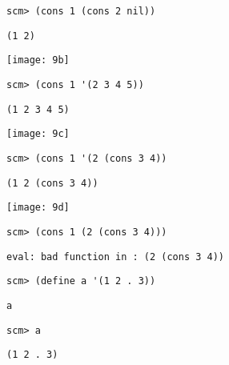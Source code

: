 \documentclass{exam}
\begin{document}
\begin{questions}
\begin{blocksection}
\begin{lstlisting}
scm> (cons 1 (cons 2 nil))
\end{lstlisting}
\begin{solution}[0.25in]
\texttt{(1 2)}
\begin{center}
\texttt{[image: 9b]}
\end{center}
\end{solution}

\begin{lstlisting}
scm> (cons 1 '(2 3 4 5))
\end{lstlisting}
\begin{solution}[0.25in]
\texttt{(1 2 3 4 5)}
\begin{center}
\texttt{[image: 9c]}
\end{center}
\end{solution}

\begin{lstlisting}
scm> (cons 1 '(2 (cons 3 4))
\end{lstlisting}
\begin{solution}[0.25in]
\texttt{(1 2 (cons 3 4))}
\begin{center}
\texttt{[image: 9d]}
\end{center}
\end{solution}

\begin{lstlisting}
scm> (cons 1 (2 (cons 3 4)))
\end{lstlisting}
\begin{solution}[.25in]
\begin{lstlisting}
eval: bad function in : (2 (cons 3 4))
\end{lstlisting}
\end{solution}
\end{blocksection}

\begin{blocksection}
\begin{lstlisting}
scm> (define a '(1 2 . 3))
\end{lstlisting}
\begin{solution}[.25in]
\begin{lstlisting}
a
\end{lstlisting}
\end{solution}

\begin{lstlisting}
scm> a
\end{lstlisting}
\begin{solution}[.25in]
\begin{lstlisting}
(1 2 . 3)
\end{lstlisting}
\end{solution}


\end{blocksection}
\end{questions}
\end{document}
